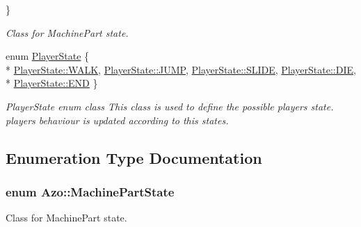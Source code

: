 \begin{DoxyCompactItemize}
 \}\begin{DoxyCompactList}\small\item\em Class for Machine\+Part state. \end{DoxyCompactList}
\item 
enum \hyperlink{namespace_azo_ab6013e2aec3a179604cef5ea80418e33}{Player\+State} \{ \\*
\hyperlink{namespace_azo_ab6013e2aec3a179604cef5ea80418e33abb2dfc184fa2e91373d3ff304cb01b8a}{Player\+State\+::\+W\+A\+LK}, 
\hyperlink{namespace_azo_ab6013e2aec3a179604cef5ea80418e33a40222410c7347ec4b6bcaba3bcb21f3b}{Player\+State\+::\+J\+U\+MP}, 
\hyperlink{namespace_azo_ab6013e2aec3a179604cef5ea80418e33ab4bece16f41bf005ca3fb5358b67b0c6}{Player\+State\+::\+S\+L\+I\+DE}, 
\hyperlink{namespace_azo_ab6013e2aec3a179604cef5ea80418e33a83ebd7c89f4cc1a85396fba7d6f7e900}{Player\+State\+::\+D\+IE}, 
\\*
\hyperlink{namespace_azo_ab6013e2aec3a179604cef5ea80418e33ab1a326c06d88bf042f73d70f50197905}{Player\+State\+::\+E\+ND}
 \}\begin{DoxyCompactList}\small\item\em Player\+State enum class This class is used to define the possible player\textquotesingle{}s state. player\textquotesingle{}s behaviour is updated according to this states. \end{DoxyCompactList}
\end{DoxyCompactItemize}


\subsection{Enumeration Type Documentation}
\subsubsection[{\texorpdfstring{Machine\+Part\+State}{MachinePartState}}]{\setlength{\rightskip}{0pt plus 5cm}enum {\bf Azo\+::\+Machine\+Part\+State}\hspace{0.3cm}{\ttfamily [strong]}}\hypertarget{namespace_azo_a75e30005795a46482a25b996ca785c67}{}\label{namespace_azo_a75e30005795a46482a25b996ca785c67}


Class for Machine\+Part state. 


